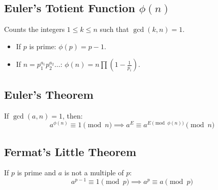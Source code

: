 \subsection*{Euler's Totient Function $\phi(n)$}
Counts the integers $1 \le k \le n$ such that $\gcd(k, n) = 1$.
\begin{itemize}
	\item If $p$ is prime: $\phi(p) = p-1$.
	\item If $n = p_1^{a_1} p_2^{a_2} \dots$: $\phi(n) = n \prod \left(1 - \frac{1}{p_i}\right)$.
\end{itemize}

\subsection*{Euler's Theorem}
If $\gcd(a, n) = 1$, then:
\begin{equation*}
	a^{\phi(n)} \equiv 1 \pmod n \implies a^E \equiv a^{E \pmod{\phi(n)}} \pmod n
\end{equation*}

\subsection*{Fermat's Little Theorem}
If $p$ is prime and $a$ is not a multiple of $p$:
\begin{equation*}
	a^{p-1} \equiv 1 \pmod p \implies a^p \equiv a \pmod p
\end{equation*}
